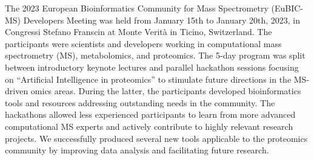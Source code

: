 The 2023 European Bioinformatics Community for Mass Spectrometry (EuBIC-MS) Developers Meeting was held from January 15th to January 20th, 2023, in Congressi Stefano Franscin at Monte Verità in Ticino, Switzerland. The participants were scientists and developers working in computational mass spectrometry (MS), metabolomics, and proteomics. The 5-day program was split between introductory keynote lectures and parallel hackathon sessions focusing on ``Artificial Intelligence in proteomics'' to stimulate future directions in the MS-driven omics areas. During the latter, the participants developed bioinformatics tools and resources addressing outstanding needs in the community. The hackathons allowed less experienced participants to learn from more advanced computational MS experts and actively contribute to highly relevant research projects. We successfully produced several new tools applicable to the proteomics community by improving data analysis and facilitating future research.

